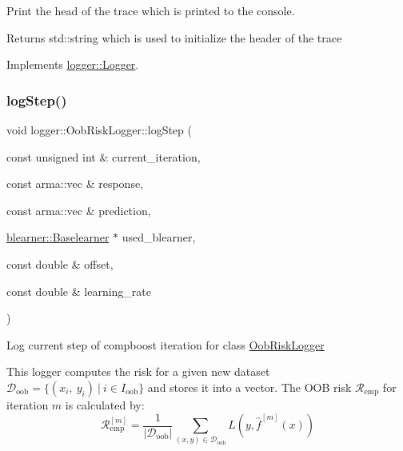 Print the head of the trace which is printed to the console. 

\begin{DoxyReturn}{Returns}
{\ttfamily std\+::string} which is used to initialize the header of the trace 
\end{DoxyReturn}


Implements \mbox{\hyperlink{classlogger_1_1_logger_a825f96e8564ac4013ff09ef842c0aeec}{logger\+::\+Logger}}.

\mbox{\label{classlogger_1_1_oob_risk_logger_a948a89f02ac782c25a15c49c4a108c02}} 
\subsubsection{\texorpdfstring{log\+Step()}{logStep()}}
{\footnotesize\ttfamily void logger\+::\+Oob\+Risk\+Logger\+::log\+Step (\begin{DoxyParamCaption}\item[{const unsigned int \&}]{current\+\_\+iteration,  }\item[{const arma\+::vec \&}]{response,  }\item[{const arma\+::vec \&}]{prediction,  }\item[{\mbox{\hyperlink{classblearner_1_1_baselearner}{blearner\+::\+Baselearner}} $\ast$}]{used\+\_\+blearner,  }\item[{const double \&}]{offset,  }\item[{const double \&}]{learning\+\_\+rate }\end{DoxyParamCaption})\hspace{0.3cm}{\ttfamily [virtual]}}



Log current step of compboost iteration for class {\ttfamily \mbox{\hyperlink{classlogger_1_1_oob_risk_logger}{Oob\+Risk\+Logger}}} 

This logger computes the risk for a given new dataset $\mathcal{D}_\mathrm{oob} = \{(x_i,\ y_i)\ |\ i \in I_\mathrm{oob}\}$ and stores it into a vector. The O\+OB risk $\mathcal{R}_\mathrm{emp}$ for iteration $m$ is calculated by\+: \[ \mathcal{R}_\mathrm{emp}^{[m]} = \frac{1}{|\mathcal{D}_\mathrm{oob}|}\sum\limits_{(x,y) \in \mathcal{D}_\mathrm{oob}} L(y, \hat{f}^{[m]}(x)) \]


